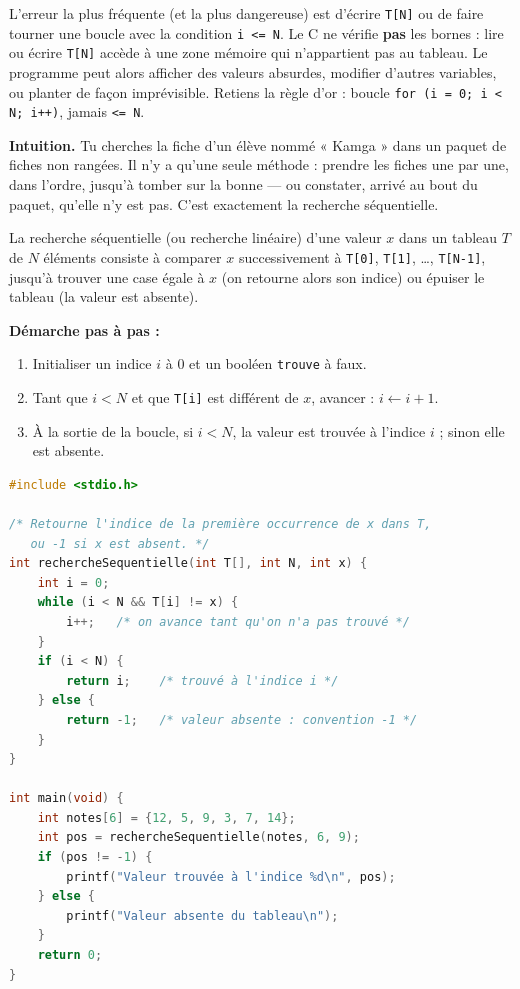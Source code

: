 \documentclass[11pt]{article}
\newcommand{\cle}[1]{{\popxbold\color{popdark}#1}}
\newcounter{popsec}
\newcounter{popsub}
\newcommand{\courssub}[1]{%
  \stepcounter{popsub}%
  \par\vspace{9pt}\noindent{\popxbold\fontsize{11.5}{13}\selectfont\color{popink}{\color{poporange}\thepopsec.\thepopsub}\hspace{6pt}#1}\par\nopagebreak\vspace{4pt}
}
\begin{document}
\begin{attention}
L'erreur la plus fréquente (et la plus dangereuse) est d'écrire \texttt{T[N]} ou de faire tourner une boucle avec la condition \texttt{i <= N}. Le C ne vérifie \textbf{pas} les bornes : lire ou écrire \texttt{T[N]} accède à une zone mémoire qui n'appartient pas au tableau. Le programme peut alors afficher des valeurs absurdes, modifier d'autres variables, ou planter de façon imprévisible. Retiens la règle d'or : boucle \texttt{for (i = 0; i < N; i++)}, jamais \texttt{<= N}.
\end{attention}

\courssub{La recherche séquentielle}

\textbf{Intuition.} Tu cherches la fiche d'un élève nommé « Kamga » dans un paquet de fiches non rangées. Il n'y a qu'une seule méthode : prendre les fiches une par une, dans l'ordre, jusqu'à tomber sur la bonne — ou constater, arrivé au bout du paquet, qu'elle n'y est pas. C'est exactement la recherche séquentielle.

\begin{definition}
La \cle{recherche séquentielle} (ou recherche linéaire) d'une valeur $x$ dans un tableau $T$ de $N$ éléments consiste à comparer $x$ successivement à \texttt{T[0]}, \texttt{T[1]}, \ldots, \texttt{T[N-1]}, jusqu'à trouver une case égale à $x$ (on retourne alors son indice) ou épuiser le tableau (la valeur est absente).
\end{definition}

\textbf{Démarche pas à pas :}
\begin{enumerate}
\item Initialiser un indice $i$ à $0$ et un booléen \texttt{trouve} à faux.
\item Tant que $i < N$ et que \texttt{T[i]} est différent de $x$, avancer : $i \leftarrow i+1$.
\item À la sortie de la boucle, si $i < N$, la valeur est trouvée à l'indice $i$ ; sinon elle est absente.
\end{enumerate}

\begin{exemplebox}
\begin{lstlisting}[language=C]
#include <stdio.h>

/* Retourne l'indice de la première occurrence de x dans T,
   ou -1 si x est absent. */
int rechercheSequentielle(int T[], int N, int x) {
    int i = 0;
    while (i < N && T[i] != x) {
        i++;   /* on avance tant qu'on n'a pas trouvé */
    }
    if (i < N) {
        return i;    /* trouvé à l'indice i */
    } else {
        return -1;   /* valeur absente : convention -1 */
    }
}

int main(void) {
    int notes[6] = {12, 5, 9, 3, 7, 14};
    int pos = rechercheSequentielle(notes, 6, 9);
    if (pos != -1) {
        printf("Valeur trouvée à l'indice %d\n", pos);
    } else {
        printf("Valeur absente du tableau\n");
    }
    return 0;
}
\end{lstlisting}
\end{exemplebox}
\end{document}
